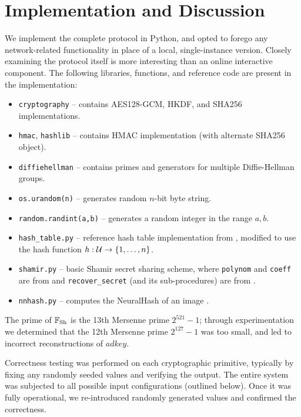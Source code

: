 

\section{Implementation and Discussion} %
\label{sec:implementation_details}

We implement the complete protocol in Python, and opted to forego any network-related functionality in place of a local, single-instance version. Closely examining the protocol itself is more interesting than an online interactive component. The following libraries, functions, and reference code are present in the implementation:
\begin{itemize}
	\item \texttt{cryptography} -- contains AES128-GCM, HKDF, and SHA256 implementations.
	\item \texttt{hmac}, \texttt{hashlib} -- contains HMAC implementation (with alternate SHA256 object).
	\item \texttt{diffiehellman} -- contains primes and generators for multiple Diffie-Hellman groups.
	\item \texttt{os.urandom(n)} -- generates random $n$-bit byte string.
	\item \texttt{random.randint(a,b)} -- generates a random integer in the range $a,b$.
	\item \texttt{hash_table.py} -- reference hash table implementation from \cite{lind2021hash}, modified to use the hash function $h: \mathcal{U} \to \left\{1,\dots,n\right\}$.
	\item \texttt{shamir.py} -- basic Shamir secret sharing scheme, where \texttt{polynom} and \texttt{coeff} are from \cite{geek2021sha} and  \texttt{recover_secret} (and its sub-procedures) are from \cite{wiki2021sha}. 
	\item \texttt{nnhash.py} -- computes the NeuralHash of an image \cite{ygvarAppleNeuralHash2ONNX2021}.
\end{itemize}
The prime of $\mathbb{F}_{\text{Sh}}$ is the 13th Mersenne prime $2^{521} - 1$; through experimentation we determined that the 12th Mersenne prime $2^{127} - 1$ was too small, and led to incorrect reconstructions of $adkey$.

Correctness testing was performed on each cryptographic primitive, typically by fixing any randomly seeded values and verifying the output. The entire system was subjected to all possible input configurations (outlined below). Once it was fully operational, we re-introduced randomly generated values and confirmed the correctness.



